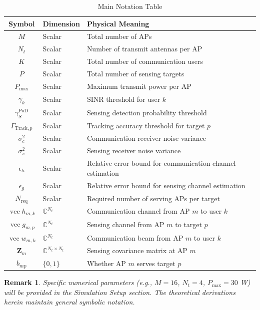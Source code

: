 \documentclass[12pt,a4paper]{article}
\DeclareMathOperator{\vect}{vec}
\newcommand{\mat}[1]{\mathbf{#1}}
\newtheorem{remark}{Remark}
\begin{document}
\begin{table}[htbp]
\centering
\caption{Main Notation Table}\label{tab:symbols}
\begin{tabular}{cll}
\toprule
Symbol & Dimension & Physical Meaning \\
\midrule
$M$ & Scalar & Total number of APs \\
$N_t$ & Scalar & Number of transmit antennas per AP \\
$K$ & Scalar & Total number of communication users \\
$P$ & Scalar & Total number of sensing targets \\
$P_{\max}$ & Scalar & Maximum transmit power per AP \\
$\gamma_k$ & Scalar & SINR threshold for user $k$ \\
$\gamma_S^{\text{PoD}}$ & Scalar & Sensing detection probability threshold \\
$\Gamma_{\text{Track},p}$ & Scalar & Tracking accuracy threshold for target $p$ \\
$\sigma_c^2$ & Scalar & Communication receiver noise variance \\
$\sigma_s^2$ & Scalar & Sensing receiver noise variance \\
$\epsilon_h$ & Scalar & Relative error bound for communication channel estimation \\
$\epsilon_g$ & Scalar & Relative error bound for sensing channel estimation \\
$N_{\text{req}}$ & Scalar & Required number of serving APs per target \\
$\vect{h}_{m,k}$ & $\mathbb{C}^{N_t}$ & Communication channel from AP $m$ to user $k$ \\
$\vect{g}_{m,p}$ & $\mathbb{C}^{N_t}$ & Sensing channel from AP $m$ to target $p$ \\
$\vect{w}_{m,k}$ & $\mathbb{C}^{N_t}$ & Communication beam from AP $m$ to user $k$ \\
$\mat{Z}_m$ & $\mathbb{C}^{N_t \times N_t}$ & Sensing covariance matrix at AP $m$ \\
$b_{mp}$ & $\{0,1\}$ & Whether AP $m$ serves target $p$ \\
\bottomrule
\end{tabular}
\end{table}

\begin{remark}
Specific numerical parameters (e.g., $M=16$, $N_t=4$, $P_{\max}=30$ W) will be provided in the Simulation Setup section. The theoretical derivations herein maintain general symbolic notation.
\end{remark}
\end{document}
